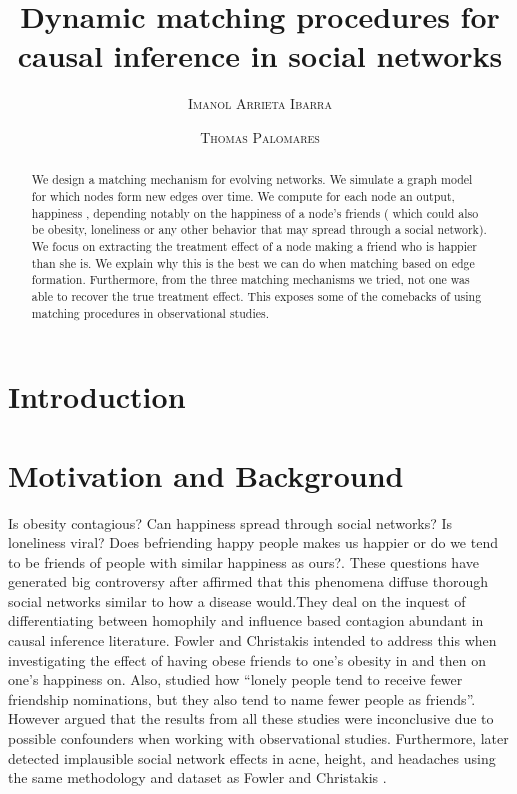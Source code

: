 \documentclass[11pt]{article}
\title{Dynamic matching procedures for causal inference in social networks}
\author{{\textsc{Imanol Arrieta Ibarra}} \\
 \and {\textsc{Thomas Palomares}} \\
}
\begin{document}
\maketitle


\begin{abstract}
We design a matching mechanism for evolving networks. We simulate a graph model for which nodes form new edges over time. We compute for each node an output, happiness , depending notably on the happiness of a node's friends ( which could also be obesity, loneliness or any other behavior that may spread through a social network). We focus on extracting the treatment effect of a node making a friend who is happier than she is. We explain why this is the best we can do when matching based on edge formation. Furthermore, from the three matching mechanisms we tried, not one was able to recover the true treatment effect. This exposes some of the comebacks of using matching procedures in observational studies. 

\end{abstract}

\newpage

\section{Introduction}




\section{Motivation and Background}



Is obesity contagious? Can happiness spread through social networks? Is loneliness viral? Does befriending happy people makes us happier or do we tend to be friends of people with similar happiness as ours?. These questions have generated big controversy after \cite{christakis2007spread} affirmed that this phenomena diffuse thorough social networks similar to how a disease would.They deal on  the inquest of differentiating between homophily and influence based contagion abundant in causal inference literature. Fowler and Christakis intended to address this when investigating the effect of having obese friends to one’s obesity in \citep{christakis2007spread} and then on one’s happiness on. Also, \citep{cacioppo2009alone} studied how “lonely people tend to receive fewer friendship nominations, but they also tend to name fewer people as friends”. However \citep{shalizi2011homophily} argued that the results from all these studies were inconclusive due to possible confounders when working with observational studies. Furthermore, \citep{cohen2008detecting} later detected implausible social network effects in acne, height, and headaches using the same methodology and dataset as Fowler and Christakis . \\
\end{document}
